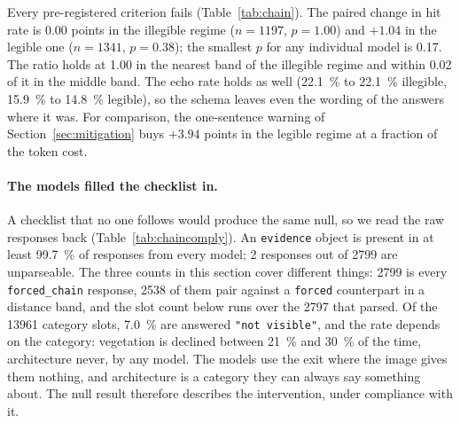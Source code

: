 \documentclass[10pt,a4paper]{article}
\begin{document}
Every pre-registered criterion fails (Table~\ref{tab:chain}). The paired change
in hit rate is $\num{0.00}$ points in the illegible regime ($n=\num{1197}$,
$p=\num{1.00}$) and $+\num{1.04}$ in the legible one ($n=\num{1341}$,
$p=\num{0.38}$); the smallest $p$ for any individual model is \num{0.17}. The
ratio holds at \num{1.00} in the nearest band of the illegible regime and
within \num{0.02} of it in the middle band. The echo rate holds as well
(\SI{22.1}{\percent} to \SI{22.1}{\percent} illegible, \SI{15.9}{\percent} to
\SI{14.8}{\percent} legible), so the schema leaves even the wording of the
answers where it was.
For comparison, the one-sentence warning of Section~\ref{sec:mitigation} buys
$+\num{3.94}$ points in the legible regime at a fraction of the token cost.

\paragraph{The models filled the checklist in.} A checklist that no one follows
would produce the same null, so we read the raw responses back
(Table~\ref{tab:chaincomply}). An \texttt{evidence} object is present in at
least \SI{99.7}{\percent} of responses from every model; \num{2} responses out
of \num{2799} are unparseable. The three counts in this section cover different
things: \num{2799} is every \texttt{forced\_chain} response, \num{2538} of them
pair against a \texttt{forced} counterpart in a distance band, and the slot
count below runs over the \num{2797} that parsed. Of the \num{13961} category
slots,
\SI{7.0}{\percent} are answered \texttt{"not visible"}, and the rate depends on
the category: vegetation is declined between \SI{21}{\percent} and
\SI{30}{\percent} of the time, architecture never, by any model. The models use
the exit where the image gives them nothing, and architecture is a category they
can always say something about. The null result therefore describes the
intervention, under compliance with it.
\end{document}
